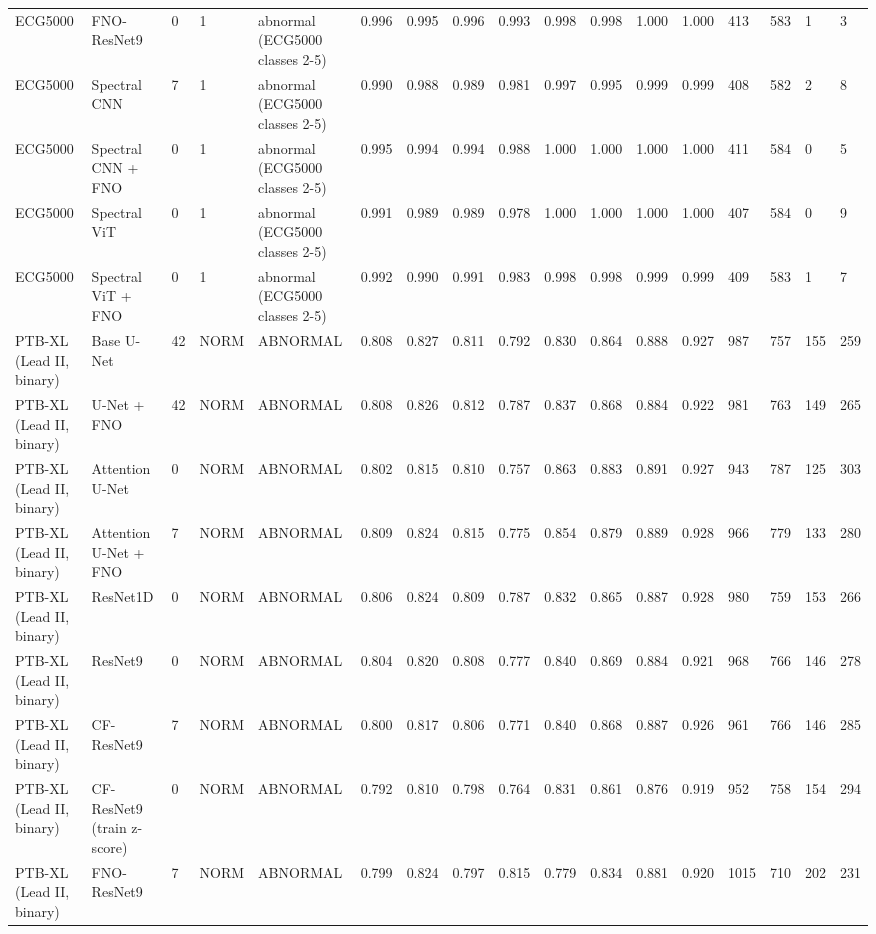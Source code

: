 \begin{longtable}{lllllllllllllllll}
ECG5000 & FNO-ResNet9 & 0 & 1 & abnormal (ECG5000 classes 2-5) & 0.996 & 0.995 & 0.996 & 0.993 & 0.998 & 0.998 & 1.000 & 1.000 & 413 & 583 & 1 & 3 \\
ECG5000 & Spectral CNN & 7 & 1 & abnormal (ECG5000 classes 2-5) & 0.990 & 0.988 & 0.989 & 0.981 & 0.997 & 0.995 & 0.999 & 0.999 & 408 & 582 & 2 & 8 \\
ECG5000 & Spectral CNN + FNO & 0 & 1 & abnormal (ECG5000 classes 2-5) & 0.995 & 0.994 & 0.994 & 0.988 & 1.000 & 1.000 & 1.000 & 1.000 & 411 & 584 & 0 & 5 \\
ECG5000 & Spectral ViT & 0 & 1 & abnormal (ECG5000 classes 2-5) & 0.991 & 0.989 & 0.989 & 0.978 & 1.000 & 1.000 & 1.000 & 1.000 & 407 & 584 & 0 & 9 \\
ECG5000 & Spectral ViT + FNO & 0 & 1 & abnormal (ECG5000 classes 2-5) & 0.992 & 0.990 & 0.991 & 0.983 & 0.998 & 0.998 & 0.999 & 0.999 & 409 & 583 & 1 & 7 \\
PTB-XL (Lead II, binary) & Base U-Net & 42 & NORM & ABNORMAL & 0.808 & 0.827 & 0.811 & 0.792 & 0.830 & 0.864 & 0.888 & 0.927 & 987 & 757 & 155 & 259 \\
PTB-XL (Lead II, binary) & U-Net + FNO & 42 & NORM & ABNORMAL & 0.808 & 0.826 & 0.812 & 0.787 & 0.837 & 0.868 & 0.884 & 0.922 & 981 & 763 & 149 & 265 \\
PTB-XL (Lead II, binary) & Attention U-Net & 0 & NORM & ABNORMAL & 0.802 & 0.815 & 0.810 & 0.757 & 0.863 & 0.883 & 0.891 & 0.927 & 943 & 787 & 125 & 303 \\
PTB-XL (Lead II, binary) & Attention U-Net + FNO & 7 & NORM & ABNORMAL & 0.809 & 0.824 & 0.815 & 0.775 & 0.854 & 0.879 & 0.889 & 0.928 & 966 & 779 & 133 & 280 \\
PTB-XL (Lead II, binary) & ResNet1D & 0 & NORM & ABNORMAL & 0.806 & 0.824 & 0.809 & 0.787 & 0.832 & 0.865 & 0.887 & 0.928 & 980 & 759 & 153 & 266 \\
PTB-XL (Lead II, binary) & ResNet9 & 0 & NORM & ABNORMAL & 0.804 & 0.820 & 0.808 & 0.777 & 0.840 & 0.869 & 0.884 & 0.921 & 968 & 766 & 146 & 278 \\
PTB-XL (Lead II, binary) & CF-ResNet9 & 7 & NORM & ABNORMAL & 0.800 & 0.817 & 0.806 & 0.771 & 0.840 & 0.868 & 0.887 & 0.926 & 961 & 766 & 146 & 285 \\
PTB-XL (Lead II, binary) & CF-ResNet9 (train z-score) & 0 & NORM & ABNORMAL & 0.792 & 0.810 & 0.798 & 0.764 & 0.831 & 0.861 & 0.876 & 0.919 & 952 & 758 & 154 & 294 \\
PTB-XL (Lead II, binary) & FNO-ResNet9 & 7 & NORM & ABNORMAL & 0.799 & 0.824 & 0.797 & 0.815 & 0.779 & 0.834 & 0.881 & 0.920 & 1015 & 710 & 202 & 231 \\

\end{longtable}
